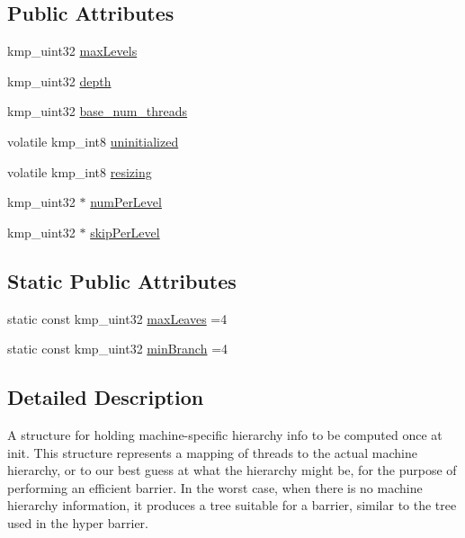 \subsection*{Public Attributes}
\begin{DoxyCompactItemize}
\item 
kmp\-\_\-uint32 \hyperlink{classhierarchy__info_aafbad4b89a239ea459aaef1ab4908aba}{max\-Levels}
\item 
kmp\-\_\-uint32 \hyperlink{classhierarchy__info_aeebcad75a7d471e1b1fd37aab6216f22}{depth}
\item 
kmp\-\_\-uint32 \hyperlink{classhierarchy__info_a9055a443e8da4aefcfef1b5f1fd43b42}{base\-\_\-num\-\_\-threads}
\item 
volatile kmp\-\_\-int8 \hyperlink{classhierarchy__info_a93f1e8f2ed894dc2477e5feb22d24c2c}{uninitialized}
\item 
volatile kmp\-\_\-int8 \hyperlink{classhierarchy__info_afa2edd0b49e3c69a50f3bbebfbd4ad77}{resizing}
\item 
kmp\-\_\-uint32 $\ast$ \hyperlink{classhierarchy__info_a12fc455d853883d91e3a19567aaac3fe}{num\-Per\-Level}
\item 
kmp\-\_\-uint32 $\ast$ \hyperlink{classhierarchy__info_a80259c2cd48bb476b3eea860723e7fa8}{skip\-Per\-Level}
\end{DoxyCompactItemize}
\subsection*{Static Public Attributes}
\begin{DoxyCompactItemize}
\item 
static const kmp\-\_\-uint32 \hyperlink{classhierarchy__info_a4122e10b5d763f2ca3f13076f836ddfe}{max\-Leaves} =4
\item 
static const kmp\-\_\-uint32 \hyperlink{classhierarchy__info_afe34e439673297d9ac44c43722c042f0}{min\-Branch} =4
\end{DoxyCompactItemize}


\subsection{Detailed Description}
A structure for holding machine-\/specific hierarchy info to be computed once at init. This structure represents a mapping of threads to the actual machine hierarchy, or to our best guess at what the hierarchy might be, for the purpose of performing an efficient barrier. In the worst case, when there is no machine hierarchy information, it produces a tree suitable for a barrier, similar to the tree used in the hyper barrier. 

